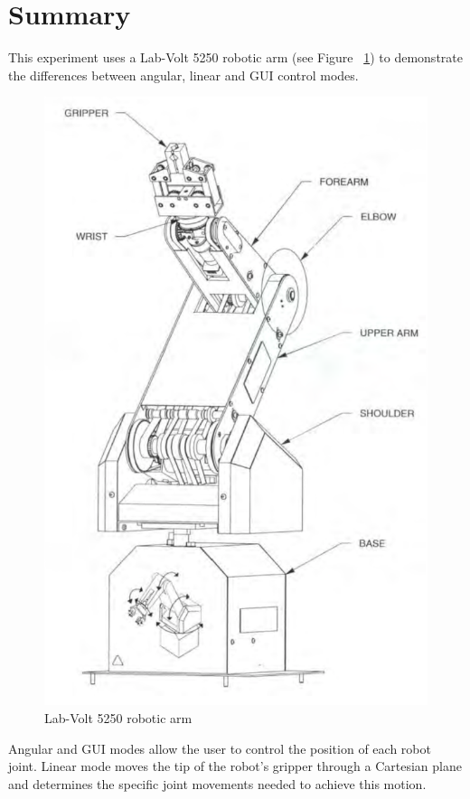 \section{Summary}\label{sec:summary}
This experiment uses a Lab-Volt 5250 robotic arm (see Figure ~\ref{fig:arm}) to demonstrate the differences between angular, linear and GUI control modes.
\begin{figure}[tbph]
  \centering
  \includegraphics[width=0.4\linewidth]{graphics/arm}
  \caption{Lab-Volt 5250 robotic arm}
  \label{fig:arm}
\end{figure}

Angular and GUI modes allow the user to control the position of each robot joint.
Linear mode moves the tip of the robot's gripper through a Cartesian plane and determines the specific joint movements needed to achieve this motion.
